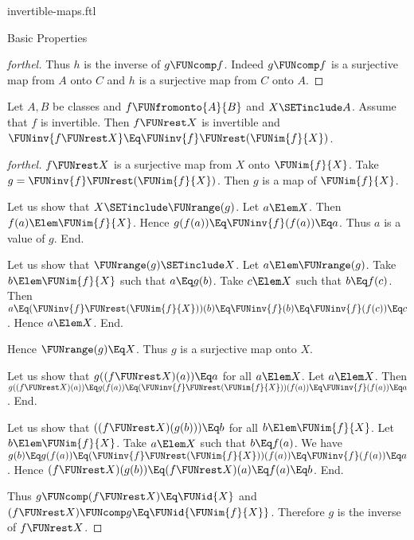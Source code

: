 \documentclass{stex}
\begin{document}
\begin{smodule}{invertible-maps.ftl}
\begin{sfragment}{Basic Properties}
\begin{proof}[forthel]
    Thus $h$ is the inverse of $g \FUNcomp f$.
    Indeed $g \FUNcomp f$ is a surjective map from $A$ onto $C$ and $h$ is a surjective map from $C$ onto $A$.
  \end{proof}

  \begin{proposition}[forthel]
    Let $A, B$ be classes and $f \FUNfromonto{A}{B}$ and $X \SETinclude A$.
    Assume that $f$ is invertible.
    Then $f \FUNrest X$ is invertible and $\FUNinv{f\FUNrest X} \Eq \FUNinv{f} \FUNrest (\FUNim{f}{X})$.
  \end{proposition}
  \begin{proof}[forthel]
    $f \FUNrest X$ is a surjective map from $X$ onto $\FUNim{f}{X}$.
    Take $g = \FUNinv{f} \FUNrest (\FUNim{f}{X})$.
    Then $g$ is a map of $\FUNim{f}{X}$.

    Let us show that $X \SETinclude \FUNrange(g)$.
      Let $a \Elem X$.
      Then $f(a) \Elem \FUNim{f}{X}$.
      Hence $g(f(a)) \Eq \FUNinv{f}(f(a)) \Eq a$.
      Thus $a$ is a value of $g$.
    End.

    Let us show that $\FUNrange(g) \SETinclude X$.
      Let $a \Elem \FUNrange(g)$.
      Take $b \Elem \FUNim{f}{X}$ such that $a \Eq g(b)$.
      Take $c \Elem X$ such that $b \Eq f(c)$.
      Then $a
        \Eq (\FUNinv{f} \FUNrest (\FUNim{f}{X}))(b)
        \Eq \FUNinv{f}(b)
        \Eq \FUNinv{f}(f(c))
        \Eq c$.
      Hence $a \Elem X$.
    End.

    Hence $\FUNrange(g) \Eq X$.
    Thus $g$ is a surjective map onto $X$.

    Let us show that $g((f \FUNrest X)(a)) \Eq a$ for all $a \Elem X$.
      Let $a \Elem X$.
      Then $g((f \FUNrest X)(a))
        \Eq g(f(a))
        \Eq (\FUNinv{f} \FUNrest (\FUNim{f}{X}))(f(a))
        \Eq \FUNinv{f}(f(a))
        \Eq a$.
    End.

    Let us show that $((f \FUNrest X)(g(b))) \Eq b$ for all $b \Elem \FUNim{f}{X}$.
      Let $b \Elem \FUNim{f}{X}$.
      Take $a \Elem X$ such that $b \Eq f(a)$.
      We have $g(b)
        \Eq g(f(a))
        \Eq (\FUNinv{f} \FUNrest (\FUNim{f}{X}))(f(a))
        \Eq \FUNinv{f}(f(a))
        \Eq a$.
      Hence $(f \FUNrest X)(g(b))
        \Eq (f \FUNrest X)(a)
        \Eq f(a)
        \Eq b$.
    End.

    Thus $g \FUNcomp (f \FUNrest X) \Eq \FUNid{X}$ and $(f \FUNrest X) \FUNcomp g \Eq \FUNid{\FUNim{f}{X}}$.
    Therefore $g$ is the inverse of $f \FUNrest X$.
  \end{proof}


\end{sfragment}
\end{smodule}
\end{document}
